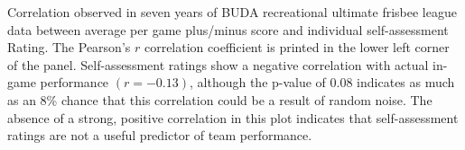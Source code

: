 Correlation observed in seven years of BUDA recreational ultimate frisbee league data between average per game plus/minus score and individual self-assessment Rating.  The Pearson's $r$ correlation coefficient is printed in the lower left corner of the panel. Self-assessment ratings show a negative correlation with actual in-game performance $(r = -0.13)$, although the p-value of 0.08 indicates as much as an 8\% chance that this correlation could be a result of random noise. The absence of a strong, positive correlation in this plot indicates that self-assessment ratings are not a useful predictor of team performance. \label{fig:correlation_self}